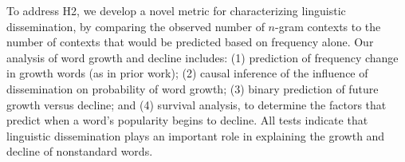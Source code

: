 To address H2, we develop a novel metric for characterizing linguistic dissemination, by comparing the observed number of $n$-gram contexts to the number of contexts that would be predicted based on frequency alone.
Our analysis of word growth and decline includes: (1) prediction of frequency change in growth words (as in prior work); (2) causal inference of the influence of dissemination on probability of word growth; (3) binary prediction of future growth versus decline; and (4) survival analysis, to determine the factors that predict when a word's popularity begins to decline.
All tests indicate that linguistic dissemination plays an important role in explaining the growth and decline of nonstandard words.

%
